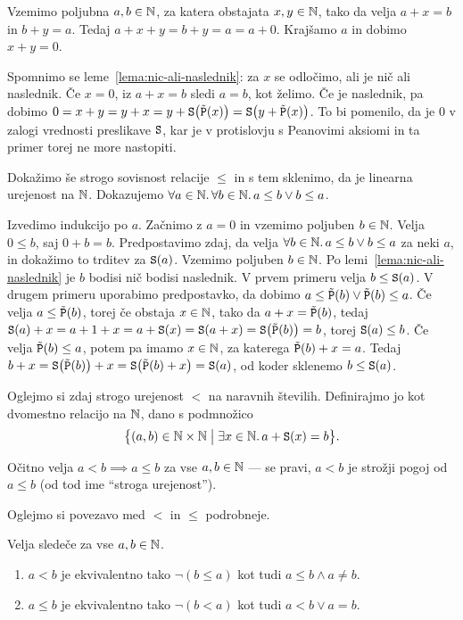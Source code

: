 Vzemimo poljubna $a, b \in \mathbb{N}$, za katera obstajata $x, y \in \mathbb{N}$, tako da velja $a + x = b$ in $b + y = a$. Tedaj $a + x + y = b + y = a = a + 0$. Krajšamo $a$ in dobimo $x + y = 0$.

Spomnimo se leme~\ref{lema:nic-ali-naslednik}: za $x$ se odločimo, ali je nič ali naslednik. Če $x = 0$, iz $a + x = b$ sledi $a = b$, kot želimo. Če je naslednik, pa dobimo $0 = x + y = y + x = y + \mathtt{S}\big(\tilde{\mathtt{P}}(x)\big) = \mathtt{S}\big(y + \tilde{\mathtt{P}}(x)\big)$. To bi pomenilo, da je $0$ v zalogi vrednosti preslikave $\mathtt{S}$, kar je v protislovju s Peanovimi aksiomi in ta primer torej ne more nastopiti.

Dokažimo še strogo sovisnost relacije $\leq$ in s tem sklenimo, da je linearna urejenost na $\mathbb{N}$. Dokazujemo $\forall a \in \mathbb{N} .\,\forall b \in \mathbb{N} .\,{a \leq b \lor b \leq a}$.

Izvedimo indukcijo po $a$. Začnimo z $a = 0$ in vzemimo poljuben $b \in \mathbb{N}$. Velja $0 \leq b$, saj $0 + b = b$. Predpostavimo zdaj, da velja $\forall b \in \mathbb{N} .\,{a \leq b \lor b \leq a}$ za neki $a$, in dokažimo to trditev za $\mathtt{S}(a)$. Vzemimo poljuben $b \in \mathbb{N}$. Po lemi~\ref{lema:nic-ali-naslednik} je $b$ bodisi nič bodisi naslednik. V prvem primeru velja $b \leq \mathtt{S}(a)$. V drugem primeru uporabimo predpostavko, da dobimo $a \leq \tilde{\mathtt{P}}(b) \lor \tilde{\mathtt{P}}(b) \leq a$. Če velja $a \leq \tilde{\mathtt{P}}(b)$, torej če obstaja $x \in \mathbb{N}$, tako da $a + x = \tilde{\mathtt{P}}(b)$, tedaj $\mathtt{S}(a) + x = a + 1 + x = a + \mathtt{S}(x) = \mathtt{S}(a + x) = \mathtt{S}\big(\tilde{\mathtt{P}}(b)\big) = b$, torej $\mathtt{S}(a) \leq b$. Če velja $\tilde{\mathtt{P}}(b) \leq a$, potem pa imamo $x \in \mathbb{N}$, za katerega $\tilde{\mathtt{P}}(b) + x = a$. Tedaj $b + x = \mathtt{S}\big(\tilde{\mathtt{P}}(b)\big) + x = \mathtt{S}\big(\tilde{\mathtt{P}}(b) + x\big) = \mathtt{S}(a)$, od koder sklenemo $b \leq \mathtt{S}(a)$.

Oglejmo si zdaj strogo urejenost $<$ na naravnih številih.  Definirajmo jo kot dvomestno relacijo na $\mathbb{N}$, dano s podmnožico
\[\set[1]{(a, b) \in \NN \times \NN}{\some{x \in \NN}{a + \suc(x) = b}}.\]

Očitno velja $a < b \implies a \leq b$ za vse $a, b \in \mathbb{N}$ --- se pravi, $a < b$ je strožji pogoj od $a \leq b$ (od tod ime ``stroga urejenost'').

Oglejmo si povezavo med $<$ in $\leq$ podrobneje.

\begin{trditev}
Velja sledeče za vse $a, b \in \mathbb{N}$.
\begin{enumerate}
\item
$a < b$ je ekvivalentno tako $\lnot(b \leq a)$ kot tudi $a \leq b \land a \neq b$.
\item
$a \leq b$ je ekvivalentno tako $\lnot(b < a)$ kot tudi $a < b \lor a = b$.
\end{enumerate}
\end{trditev}

